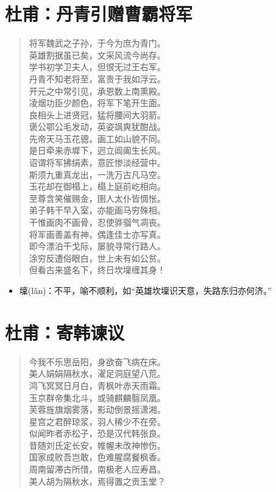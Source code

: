\documentclass[12pt,oneside]{book}
\newenvironment{shici}{
\begin{verse}
\centering\large\hspace{12pt}}
{\end{verse}}
\begin{document}
\chapter{杜甫：丹青引赠曹霸将军}
\begin{shici}
将军魏武之子孙，于今为庶为青门。\\
英雄割据虽已矣，文采风流今尚存。\\
学书初学卫夫人，但恨无过王右军。\\
丹青不知老将至，富贵于我如浮云。\\
开元之中常引见，承恩数上南熏殿。\\
凌烟功臣少颜色，将军下笔开生面。\\
良相头上进贤冠，猛将腰间大羽箭。\\
褒公鄂公毛发动，英姿飒爽犹酣战。\\
先帝天马玉花骢，画工如山貌不同。\\
是日牵来赤墀下，迥立阊阖生长风。\\
诏谓将军拂绢素，意匠惨淡经营中。\\
斯须九重真龙出，一洗万古凡马空。\\
玉花却在御榻上，榻上庭前屹相向。\\
至尊含笑催赐金，圉人太仆皆惆怅。\\
弟子韩干早入室，亦能画马穷殊相。\\
干惟画肉不画骨，忍使骅骝气凋丧。\\
将军画善盖有神，偶逢佳士亦写真。\\
即今漂泊干戈际，屡貌寻常行路人。\\
涂穷反遭俗眼白，世上未有如公贫。\\
但看古来盛名下，终日坎壈缠其身！
\end{shici}

\begin{itemize}
\item 壈(lǎn)：不平，喻不顺利，如“英雄坎壈识天意，失路东归亦何济。”
\end{itemize}

\chapter{杜甫：寄韩谏议}
\begin{shici}
今我不乐思岳阳，身欲奋飞病在床。\\
美人娟娟隔秋水，濯足洞庭望八荒。\\
鸿飞冥冥日月白，青枫叶赤天雨霜。\\
玉京群帝集北斗，或骑麒麟翳凤凰。\\
芙蓉旌旗烟雾落，影动倒景摇潇湘。\\
星宫之君醉琼浆，羽人稀少不在旁。\\
似闻昨者赤松子，恐是汉代韩张良。\\
昔随刘氏定长安，帷幄未改神惨伤。\\
国家成败吾岂敢，色难腥腐餐枫香。\\
周南留滞古所惜，南极老人应寿昌。\\
美人胡为隔秋水，焉得置之贡玉堂？
\end{shici}
\end{document}
